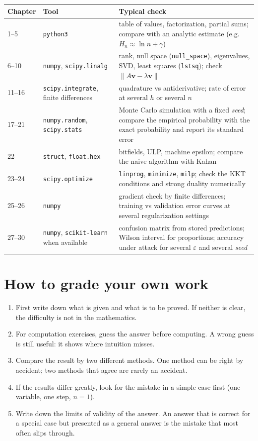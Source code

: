 \begin{center}
\small
\begin{tabular}{@{}llp{7.2cm}@{}}
\toprule
\textbf{Chapter} & \textbf{Tool} & \textbf{Typical check} \\
\midrule
1--5 & \texttt{python3} & table of values, factorization, partial sums; compare
  with an analytic estimate (e.g. $H_n\approx\ln n+\gamma$) \\
6--10 & \texttt{numpy}, \texttt{scipy.linalg} & rank, null space (\texttt{null\_space}),
  eigenvalues, SVD, least squares (\texttt{lstsq}); check
  $\|A\mathbf{v}-\lambda\mathbf{v}\|$ \\
11--16 & \texttt{scipy.integrate}, finite differences & quadrature vs antiderivative; rate of
  error at several $h$ or several $n$ \\
17--21 & \texttt{numpy.random}, \texttt{scipy.stats} & Monte Carlo simulation with a
  fixed \emph{seed}; compare the empirical probability with the exact probability and
  report its standard error \\
22 & \texttt{struct}, \texttt{float.hex} & bitfields, ULP, machine epsilon;
  compare the naive algorithm with Kahan \\
23--24 & \texttt{scipy.optimize} & \texttt{linprog}, \texttt{minimize},
  \texttt{milp}; check the KKT conditions and strong duality numerically \\
25--26 & \texttt{numpy} & gradient check by finite differences; training vs validation
  error curves at several regularization settings \\
27--30 & \texttt{numpy}, \texttt{scikit-learn} when available & confusion matrix from
  stored predictions; Wilson interval for proportions; accuracy under attack
  for several $\varepsilon$ and several \emph{seed} \\
\bottomrule
\end{tabular}
\end{center}

\section*{How to grade your own work}

\begin{enumerate}
  \item First write down what is given and what is to be proved.
        If neither is clear, the difficulty is not in the mathematics.
  \item For computation exercises, guess the answer before computing. A wrong guess
        is still useful: it shows where intuition misses.
  \item Compare the result by two different methods. One method can be right by
        accident; two methods that agree are rarely an accident.
  \item If the results differ greatly, look for the mistake in a simple case first
        (one variable, one step, $n=1$).
  \item Write down the limits of validity of the answer. An answer that is correct for a
        special case but presented as a general answer is the mistake that most often slips through.
\end{enumerate}
